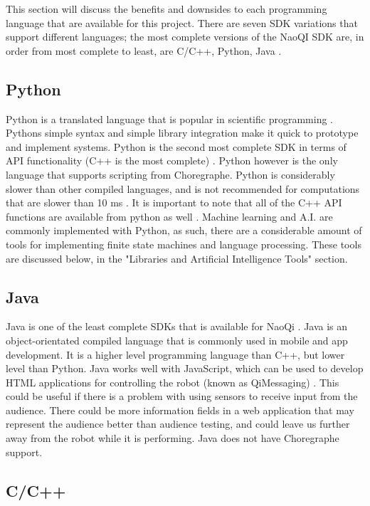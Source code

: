   This section will discuss the benefits and downsides to each programming language that are available for this project. There are seven SDK variations that support different languages; the most complete versions of the NaoQI SDK are, in order from most complete to least, are C/C++, Python, Java \cite{programmingLanguages}.

  \subsection{Python}
  Python is a translated language that is popular in scientific programming \cite{Python.org}. Pythons simple syntax and simple library integration make it quick to prototype and implement systems. Python is the second most complete SDK in terms of API functionality (C++ is the most complete) \cite{languageBenefits}. Python however is the only language that supports scripting from Choregraphe. Python is considerably slower than other compiled languages, and is not recommended for computations that are slower than 10 ms \cite{programmingLanguages}. It is important to note that all of the C++ API functions are available from python as well \cite{pythonSDK}. Machine learning and A.I. are commonly implemented with Python, as such, there are a considerable amount of tools for implementing finite state machines and language processing. These tools are discussed below, in the "Libraries and Artificial Intelligence Tools" section.
  \subsection{Java}

  Java is one of the least complete SDKs that is available for NaoQi \cite{programmingLanguages}. Java is an object-orientated compiled language that is commonly used in mobile and app development. It is a higher level programming language than C++, but lower level than Python. Java works well with JavaScript, which can be used to develop HTML applications for controlling the robot (known as QiMessaging) \cite{qimessagingjavascript}. This could be useful if there is a problem with using sensors to receive input from the audience. There could be more information fields in a web application that may represent the audience better than audience testing, and could leave us further away from the robot while it is performing. Java does not have Choregraphe support.
  \subsection{C/C++}

